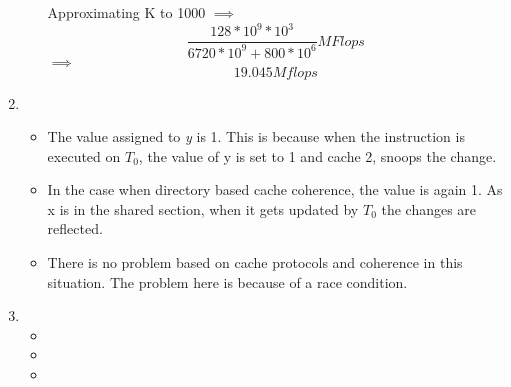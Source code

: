 \documentclass[11pt]{article}
\begin{document}
\begin{enumerate}
\begin{itemize}
\[				\]
				Approximating K to 1000 $\implies$
				\[
						\frac{128*10^9*10^3}{6720*10^9 + 800*10^6} MFlops
				\]
				$\implies$  \[
					19.045 Mflops
				\]
\end{itemize}
\item %
	\begin{itemize}
			\item The value assigned to \textit{y} is 1. This is because when the instruction is executed on $T_0$, the value of y is set to 1 and cache 2, snoops the change.
			\item In the case when directory based cache coherence, the value is again 1. As x is in the shared section, when it gets updated by $T_0$ the changes are reflected.
			\item There is no problem based on cache protocols and coherence in this situation. The problem here is because of a race condition.
	\end{itemize}
\item %
	\begin{itemize}
		\item
		\item
		\item
	\end{itemize}








\end{enumerate}
\end{document}
